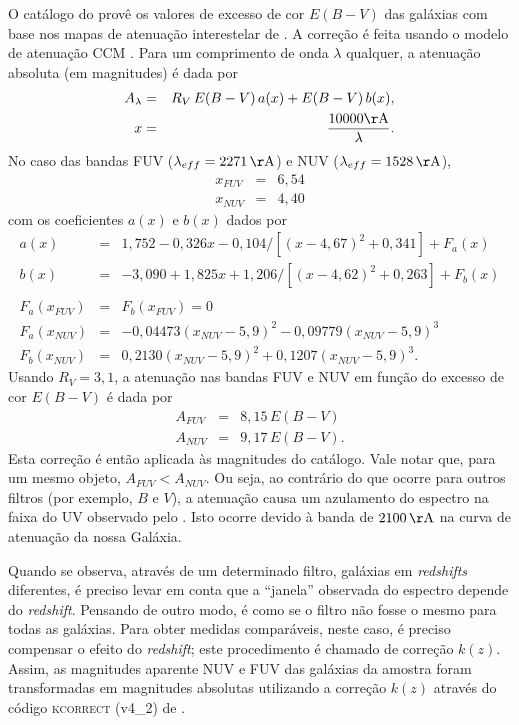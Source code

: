O catálogo do \galex provê os valores de excesso de cor $E(B-V)$ das galáxias
com base nos mapas de atenuação interestelar de \citet{Schlegel1998}. A correção
é feita usando o modelo de atenuação CCM \citep*[equações 4a e
4b]{Cardelli1989}. Para um comprimento de onda $\lambda$ qualquer, a atenuação
absoluta (em magnitudes) é dada por
\begin{eqnarray*}
	A_\lambda &=& R_V\,E(B-V)\,a(x) + E(B-V)\,b(x), \\
	x &=& \frac{10000\mathrm{\AA}}{\lambda}.
\end{eqnarray*}
No caso das bandas FUV ($\lambda_{eff}=2271\,\mathrm{\AA}$) e NUV
($\lambda_{eff}=1528\,\mathrm{\AA}$),
\begin{eqnarray*}
	x_{FUV} &=& 6,54\\
	x_{NUV} &=& 4,40
\end{eqnarray*}
com os coeficientes $a(x)$ e $b(x)$ dados por
\begin{eqnarray*}
	a(x) &=& 1,752 - 0,326x - 0,104/[(x-4,67)^2 + 0,341] + F_a(x) \\
	b(x) &=& -3,090 + 1,825x + 1,206/[(x-4,62)^2 + 0,263] + F_b(x) \\
	\\
	F_a(x_{FUV}) &=& F_b(x_{FUV}) = 0 \\
	F_a(x_{NUV}) &=& -0,04473(x_{NUV}-5,9)^2 - 0,09779(x_{NUV}-5,9)^3 \\
	F_b(x_{NUV}) &=& 0,2130(x_{NUV}-5,9)^2 + 0,1207(x_{NUV}-5,9)^3.
\end{eqnarray*}
Usando $R_V=3,1$, a atenuação nas bandas FUV e NUV em função do excesso de cor
$E(B-V)$ é dada por
\begin{eqnarray*}
	A_{FUV} &=& 8,15\,E(B-V) \\
	A_{NUV} &=& 9,17\,E(B-V).
\end{eqnarray*}
Esta correção é então aplicada às magnitudes do catálogo. Vale notar que, para
um mesmo objeto, $A_{FUV} < A_{NUV}$. Ou seja, ao contrário do que ocorre para
outros filtros (por exemplo, $B$ e $V$), a atenuação causa um azulamento do
espectro na faixa do UV observado pelo \galex. Isto ocorre devido à banda de
$2100\,\mathrm{\AA}$ na curva de atenuação da nossa Galáxia.

Quando se observa, através de um determinado filtro, galáxias em {\em redshifts}
diferentes, é preciso levar em conta que a ``janela'' observada do espectro
depende do {\em redshift}. Pensando de outro modo, é como se o filtro não fosse
o mesmo para todas as galáxias. Para obter medidas comparáveis, neste caso, é
preciso compensar o efeito do {\em redshift}; este procedimento é chamado de
correção $k(z)$. Assim, as magnitudes aparente NUV e FUV das galáxias da amostra
foram transformadas em magnitudes absolutas utilizando a correção $k(z)$ através
do código \textsc{kcorrect} (v4\_2) de \citet{Blanton2007}.


